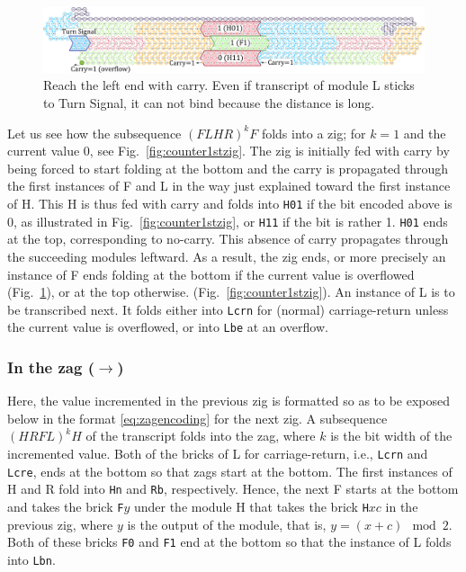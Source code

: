 \documentclass[runningheads]{llncs}
\begin{document}
\begin{figure}[tb]
\centering
\includegraphics[width=\linewidth]{fig/svg/CounterEx13_1.pdf}
\caption{
Reach the left end with carry.
Even if transcript of module L sticks to Turn Signal, it can not bind because the distance is long.
}
\label{fig:overflowex1}
\end{figure}

Let us see how the subsequence $(FLHR)^kF$ folds into a zig; for $k=1$ and the current value 0, see Fig.~\ref{fig:counter1stzig}.
The zig is initially fed with carry by being forced to start folding at the bottom and the carry is propagated through the first instances of F and L in the way just explained toward the first instance of H.
This H is thus fed with carry and folds into \texttt{H01} if the bit encoded above is 0, as illustrated in Fig.~\ref{fig:counter1stzig}, or \texttt{H11} if the bit is rather 1.
\texttt{H01} ends at the top, corresponding to no-carry.
This absence of carry propagates through the succeeding modules leftward.
As a result, the zig ends, or more precisely an instance of F ends folding at the bottom if the current value is overflowed (Fig.~\ref{fig:overflowex1}), or at the top otherwise. (Fig.~\ref{fig:counter1stzig}).
An instance of L is to be transcribed next.
It folds either into \texttt{Lcrn} for (normal) carriage-return unless the current value is overflowed, or into \texttt{Lbe} at an overflow.

\subsubsection{In the zag ($\rightarrow$)}
Here, the value incremented in the previous zig is formatted so as to be exposed below in the format \eqref{eq:zagencoding} for the next zig.
A subsequence $(HRFL)^kH$ of the transcript folds into the zag, where $k$ is the bit width of the incremented value.
Both of the bricks of L for carriage-return, i.e., \texttt{Lcrn} and \texttt{Lcre}, ends at the bottom so that zags start at the bottom.
The first instances of H and R fold into \texttt{Hn} and \texttt{Rb}, respectively.
Hence, the next F starts at the bottom and takes the brick \texttt{F}$y$ under the module H  that takes the brick \texttt{H}$xc$ in the previous zig, where $y$ is the output of the module, that is, $y = (x+c) \mod 2$.
Both of these bricks \texttt{F0} and \texttt{F1} end at the bottom so that the instance of L folds into \texttt{Lbn}.
\end{document}
